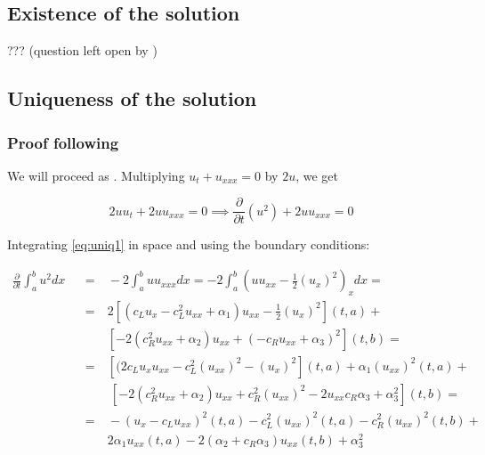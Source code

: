 \subsection{Existence of the solution}

\indent ??? (question left open by \cite{zheng2008})

\subsection{Uniqueness of the solution}

\subsubsection{Proof following \cite{zheng2008}}

\indent We will proceed as \cite{zheng2008}. Multiplying $u_t + u_{xxx} = 0$ by $2u$, we get

\begin{equation}
\label{eq:uniq1}
2uu_t + 2uu_{xxx} = 0 \implies \frac{\partial}{\partial t}(u^2) + 2uu_{xxx} = 0
\end{equation}

\indent Integrating \eqref{eq:uniq1} in space and using the boundary conditions:

\begin{equation}
\label{eq:uniq2}
\begin{aligned}
		 \frac{\partial}{\partial t} \int_a^b{u^2 dx} && = & \  -2 \int_a^b{uu_{xxx}}dx = -2 \int_a^b{\left( uu_{xx} - \frac{1}{2}(u_x)^2 \right)_x}dx = \\
		 																  && = & \ 2 \left[(c_L u_x - c_L^2 u_{xx} + \alpha_1 )u_{xx} - \frac{1}{2}(u_x)^2  \right](t,a)  +\\
		 																  &&    & \ \left[ -2(c_R^2 u_{xx} + \alpha_2 )u_{xx} + (-c_R u_{xx} + \alpha_3)^2 \right](t,b) = \\
		 																  && = & \ \left[(2c_L u_x u_{xx} - c_L^2(u_{xx})^2 - (u_x)^2 \right](t,a) +  \alpha_1(u_{xx})^2 (t,a) + \\
		 																  &&    & \ \ \left[ -2(c_R^2 u_{xx} + \alpha_2 )u_{xx} + c_R^2 (u_{xx})^2 -2u_{xx}c_R\alpha_3 + \alpha_3^2 \right](t,b) = \\
		 																  && = & \ - \left(u_x - c_Lu_{xx}\right)^2(t,a) - c_L^2 (u_{xx})^2(t,a) - c_R^2 (u_{xx})^2(t,b) + \\
		 																  &&    & \ 2\alpha_1 u_{xx}(t,a) - 2(\alpha_2 + c_R\alpha_3)u_{xx}(t,b) + \alpha_3^2 
\end{aligned}
\end{equation}

